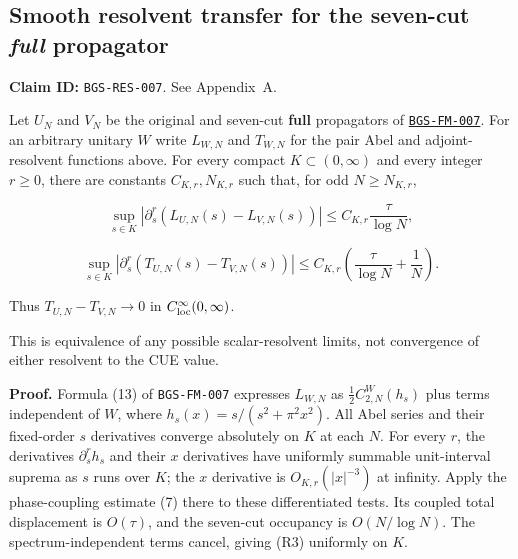 \hypertarget{smooth-resolvent-transfer-for-the-seven-cut-full-propagator}{%
\subsection{\texorpdfstring{Smooth resolvent transfer for the seven-cut \emph{full} propagator}{Smooth resolvent transfer for the seven-cut full propagator}}\label{smooth-resolvent-transfer-for-the-seven-cut-full-propagator}}

\textbf{Claim ID:} \texttt{BGS-RES-007}. See Appendix~A.

\begin{theorem}\label{pass2:frontier-res-007}

Let \(U_N\) and \(V_N\) be the original and
seven-cut \textbf{full} propagators of \href{https://github.com/ChurilovMaksim/BGS/blob/main/mathematics/frozen_seven_cut_reduction.md}{\texttt{BGS-FM-007}}.
For an arbitrary unitary \(W\) write \(L_{W,N}\) and \(T_{W,N}\) for the pair
Abel and adjoint-resolvent functions above. For every compact
\(K\subset(0,\infty)\) and every integer \(r\ge0\), there are constants
\(C_{K,r},N_{K,r}\) such that, for odd \(N\ge N_{K,r}\),

\[
\sup_{s\in K}|\partial_s^r(L_{U,N}(s)-L_{V,N}(s))|
 \le C_{K,r}\frac{\tau}{\log N},                         \tag{R3}
\]

\[
\sup_{s\in K}|\partial_s^r(T_{U,N}(s)-T_{V,N}(s))|
 \le C_{K,r}\left(\frac{\tau}{\log N}+\frac1N\right). \tag{R4}
\]

Thus \(T_{U,N}-T_{V,N}\to0\) in \(C^\infty_{\rm loc}(0,\infty)\).

\end{theorem}

This is equivalence of any possible scalar-resolvent limits, not
convergence of either resolvent to the CUE value.

\textbf{Proof.} Formula (13) of \texttt{BGS-FM-007} expresses \(L_{W,N}\) as
\(\frac12 C_{2,N}^W(h_s)\) plus terms independent of \(W\), where
\(h_s(x)=s/(s^2+\pi^2x^2)\). All Abel series and their fixed-order
\(s\) derivatives converge absolutely on \(K\) at each \(N\). For every \(r\),
the derivatives \(\partial_s^r h_s\) and their \(x\) derivatives have
uniformly summable unit-interval suprema as \(s\) runs over \(K\);
the \(x\) derivative is \(O_{K,r}(|x|^{-3})\) at infinity. Apply the
phase-coupling estimate (7) there to these differentiated tests.
Its coupled total displacement is \(O(\tau)\), and the seven-cut
occupancy is \(O(N/\log N)\). The spectrum-independent terms cancel,
giving (R3) uniformly on \(K\).

